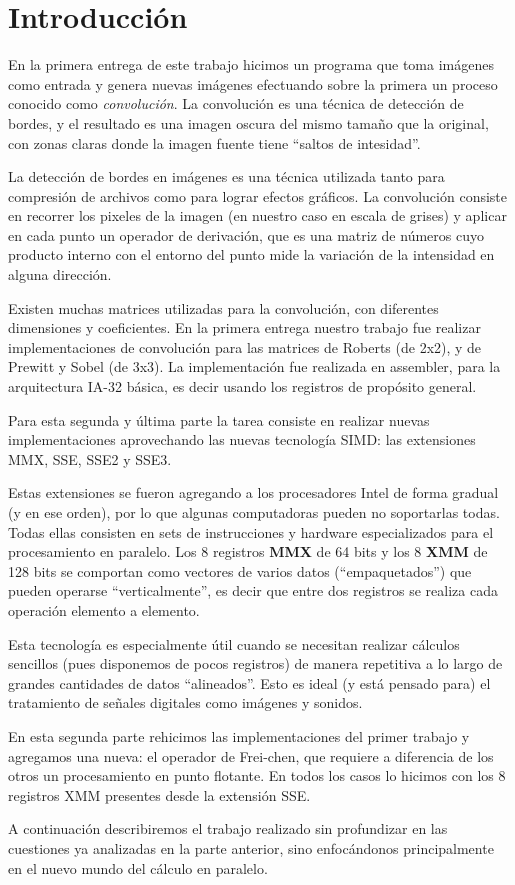\section{Introducción}

En la primera entrega de este trabajo hicimos un programa que toma imágenes como
entrada y genera nuevas imágenes efectuando sobre la primera un proceso conocido
como \emph{convolución}. La convolución es una técnica de detección de bordes, y
el resultado es una imagen oscura del mismo tamaño que la original, con zonas
claras donde la imagen fuente tiene ``saltos de intesidad''.

La detección de bordes en imágenes es una técnica utilizada tanto para compresión
de archivos como para lograr efectos gráficos. La convolución consiste en recorrer
los pixeles de la imagen (en nuestro caso en escala de grises) y aplicar en cada
punto un operador de derivación, que es una matriz de números cuyo producto
interno con el entorno del punto mide la variación de la intensidad en alguna
dirección.

Existen muchas matrices utilizadas para la convolución, con diferentes
dimensiones y coeficientes. En la primera entrega nuestro trabajo fue realizar
implementaciones de convolución para las matrices de Roberts (de 2x2), y de
Prewitt y Sobel (de 3x3). La implementación fue realizada en assembler, para la
arquitectura IA-32 básica, es decir usando los registros de propósito general.

Para esta segunda y última parte la tarea consiste en realizar nuevas 
implementaciones aprovechando las nuevas tecnología SIMD: las extensiones MMX,
SSE, SSE2 y SSE3.

Estas extensiones se fueron agregando a los procesadores Intel de forma gradual
(y en ese orden), por lo que algunas computadoras pueden no soportarlas todas.
Todas ellas consisten en sets de instrucciones y hardware especializados para el
procesamiento en paralelo. Los 8 registros \textbf{MMX} de 64 bits y los 8
\textbf{XMM} de 128 bits se comportan como vectores de varios datos (``empaquetados'')
que pueden operarse ``verticalmente'', es decir que entre dos registros se realiza
cada operación elemento a elemento.

Esta tecnología es especialmente útil cuando se necesitan realizar cálculos
sencillos (pues disponemos de pocos registros) de manera repetitiva a lo largo 
de grandes cantidades de datos ``alineados''. Esto es ideal (y está pensado para)
el tratamiento de señales digitales como imágenes y sonidos.

En esta segunda parte rehicimos las implementaciones del primer trabajo y
agregamos una nueva: el operador de Frei-chen, que requiere a diferencia de los
otros un procesamiento en punto flotante. En todos los casos lo hicimos con los
8 registros XMM presentes desde la extensión SSE.

A continuación describiremos el trabajo realizado sin profundizar en las
cuestiones ya analizadas en la parte anterior, sino enfocándonos principalmente
en el nuevo mundo del cálculo en paralelo.


